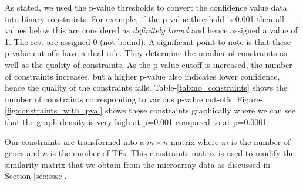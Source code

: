 As stated, we used the p-value thresholds to convert the confidence value data into binary constraints. For example, if the p-value threshold is  
0.001 then all values below this are considered as \textit{definitely bound} and hence assigned a value of 1. The rest are assigned 0 (not bound). A significant point to 
note is that these p-value cut-offs have a dual role. They determine the number of constraints as well as the quality of constraints. As the p-value cutoff is increased, 
the number of constraints increases, but a higher p-value also indicates lower confidence, hence the quality of the constraints falls. Table-\ref{tab:no_constraints} shows 
the number of constraints corresponding to various p-value cut-offs. Figure-\ref{fig:constraints_with_pval} shows these constraints graphically where we can see that the 
graph density is very high at p=0.001 compared to at p=0.0001. 

Our constraints are transformed into a $m \times n $ matrix where $m$ is the number of genes and $n$ is the number of TFs. This constraints matrix is used to modify 
the similarity matrix that we obtain from the microarray data as discussed in Section-\ref{sec:sssc}.

